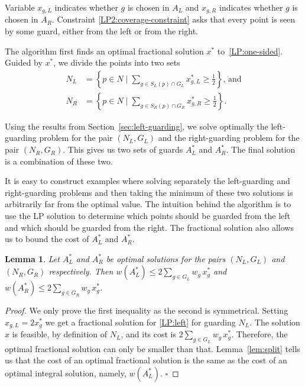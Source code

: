 \documentclass[11pt]{article}
\newcommand{\qed}{\hfill$\square$\bigskip}
\newtheorem{lemma}{Lemma}
\begin{document}
Variable $x_{g,L}$ indicates whether $g$ is chosen in $A_L$ and $x_{g,R}$
indicates whether $g$ is chosen in $A_R$.  Constraint
\eqref{LP2:coverage-constraint} asks that every point is seen by some guard,
either from the left or from the right.

The algorithm first finds an optimal fractional solution $x^*$
to~\eqref{LP:one-sided}. Guided by $x^*$, we divide the points into two
sets
\begin{align*}
  N_L &= \left \{p\in N \mid \textstyle \sum_{g\in S_L(p)\cap G_L} x_{g,L}^* \ge
    \frac12 \right\} \text{, and} \\
  N_R &= \left\{p\in N \mid \textstyle \sum_{g\in S_R(p)\cap G_R}x^*_{g,R} \ge
    \frac12 \right\}.
\end{align*}

Using the results from Section~\ref{sec:left-guarding}, we solve optimally the
left-guarding problem for the pair $(N_L,G_L)$ and the right-guarding problem
for the pair $(N_R,G_R)$. This gives us two sets of guards $A_L^*$ and $A_R^*$.
The final solution is a combination of these two.

It is easy to construct examples where solving separately the left-guarding
and right-guarding problems and then taking the minimum of these two solutions
is arbitrarily far from the optimal value. The intuition behind the algorithm
is to use the LP solution to determine which points should be guarded from the
left and which should be guarded from the right. The fractional solution also
allows us to bound the cost of $A_L^*$ and $A_R^*$.

\begin{lemma} \label{lem:AL}
  Let $A_L^*$ and $A_R^*$ be optimal solutions for the pairs $(N_L,G_L)$ and $(N_R,G_R)$
  respectively. Then $w(A_L^*) \leq 2 \sum_{g \in
    G_L} w_g\, x^*_g$ and $w(A_R^*) \leq 2 \sum_{g \in G_R} w_g \, x^*_g$.
\end{lemma}

\begin{proof}
  We only prove the first inequality as the second is symmetrical.
  Setting $x_{g,L} = 2 x^*_g$ we get a fractional solution for \eqref{LP:left}
  for guarding $N_L$. The solution $x$ is feasible, by definition of $N_L$,
  and its cost is $2 \sum_{g \in G_L} w_g\, x^*_g$. Therefore, the optimal
  fractional solution can only be smaller than that. Lemma~\ref{lem:split} tells
  us that the cost of an optimal fractional solution is the same as the cost
  of an optimal integral solution, namely, $w(A^*_L)$. \qed
\end{proof}
\end{document}
